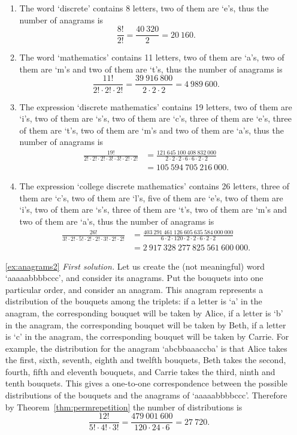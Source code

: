 \begin{enumerate}
\begin{enumerate}
\item%
The word `discrete' contains 8 letters, two of them are `e's, 
thus the number of anagrams is 
\[
\frac{8!}{2!} = \frac{40~320}{2} = 20~160. 
\]

\item%
The word `mathematics' contains 11 letters, two of them are `a's, two of them are `m's  and two of them are `t's, 
thus the number of anagrams is 
\[
\frac{11!}{2! \cdot 2! \cdot 2!} = \frac{39~916~800}{2 \cdot 2 \cdot 2} = 4~989~600. 
\]

\item%
The expression `discrete mathematics' contains 19 letters, 
two of them are `i's, 
two of them are `s's, 
two of them are `c's, 
three of them are `e's, 
three of them are `t's, 
two of them are `m's  and 
two of them are `a's,  
thus the number of anagrams is 
\begin{align*}
\frac{19!}{2! \cdot 2! \cdot 2! \cdot 3! \cdot 3! \cdot 2! \cdot 2!} &= \frac{121~645~100~408~832~000}{2 \cdot 2 \cdot 2 \cdot 6 \cdot 6 \cdot 2 \cdot 2} \\
&= 105~594~705~216~000. 
\end{align*}

\item%
The expression `college discrete mathematics' contains 26 letters, 
three of them are `c's, 
two of them are `l's, 
five of them are `e's, 
two of them are `i's, 
two of them are `s's, 
three of them are `t's, 
two of them are `m's  and 
two of them are `a's,  
thus the number of anagrams is 
\begin{align*}
\frac{26!}{3! \cdot 2! \cdot 5! \cdot 2! \cdot 2! \cdot 3! \cdot 2! \cdot 2!} &= \frac{403~291~461~126~605~635~584~000~000}{6 \cdot 2 \cdot 120 \cdot 2 \cdot 2 \cdot 6 \cdot 2 \cdot 2} \\
&= 2~917~328~277~825~561~600~000. 
\end{align*}
\end{enumerate}

\item[\ref{ex:anagrams2}]
\emph{First solution.}
Let us create the (not meaningful) word `aaaaabbbbccc', 
and consider its anagrams. 
Put the bouquets into one particular order, 
and consider an anagram. 
This anagram represents a distribution of the bouquets among the triplets: 
if a letter is `a' in the anagram, the corresponding bouquet will be taken by Alice, 
if a letter is `b' in the anagram, the corresponding bouquet will be taken by Beth, 
if a letter is `c' in the anagram, the corresponding bouquet will be taken by Carrie. 
For example, the distribution for the anagram `abcbbaaaccba' is that 
Alice takes the first, sixth, seventh, eighth and twelfth bouquets, 
Beth takes the second, fourth, fifth and eleventh bouquets, 
and Carrie takes the third, ninth and tenth bouquets. 
This gives a one-to-one correspondence between the possible distributions of the bouquets and the anagrams of `aaaaabbbbccc'. 
Therefore by Theorem~\ref{thm:permrepetition} the number of distributions is
\[
\frac{12!}{5! \cdot 4! \cdot 3!} = \frac{479~001~600}{120 \cdot 24 \cdot 6} = 27~720. 
\]


\end{enumerate}
